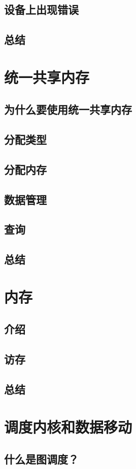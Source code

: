 \documentclass[11pt,a4paper,UTF8]{ctexart}
\begin{document}
		\subsection{设备上出现错误}
		\subsection{总结}
	\section{统一共享内存}
		\subsection{为什么要使用统一共享内存}
		\subsection{分配类型}
		\subsection{分配内存}
		\subsection{数据管理}
		\subsection{查询}
		\subsection{总结}
	\section{内存}
		\subsection{介绍}
		\subsection{访存}
		\subsection{总结}
	\section{调度内核和数据移动}
		\subsection{什么是图调度？}
\end{document}
